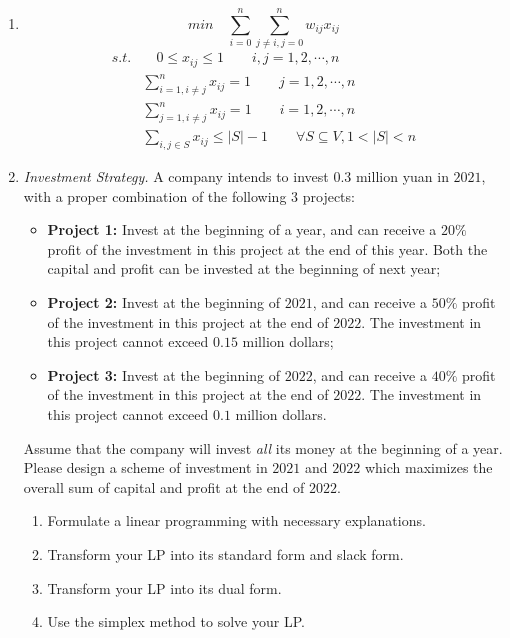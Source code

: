 \documentclass[12pt,a4paper]{article}
\makeatletter
\newtheorem*{solution}{Solution}
\theoremstyle{definition}
\renewenvironment{solution}[1][Solution] {\par\pushQED{\qed}\normalfont\topsep6\p@\@plus6\p@\relax\trivlist\item[\hskip\labelsep\bfseries#1\@addpunct{.}]\ignorespaces}{\popQED\endtrivlist\@endpefalse} \makeatother
\makeatother
\begin{document}
\begin{enumerate}
\begin{solution}
	
	$$min  \quad \sum^{n}_{i = 0}\sum^{n}_{j \neq i, j = 0} w_{ij}x_{ij}$$
	\begin{align*}
	s.t. &\quad 0 \leqslant x_{ij} \leqslant 1 \qquad i,j = 1,2,\cdots,n\\
	&\sum^{n}_{i=1,i \neq j} x_{ij} = 1  \qquad j = 1,2,\cdots,n\\
	&\sum^{n}_{j=1,i \neq j} x_{ij} = 1  \qquad i = 1,2,\cdots,n\\
	&\sum_{i,j \in S} x_{ij} \leqslant |S| - 1 \qquad \forall S \subseteq V, 1 < |S| < n
	\end{align*}
    \end{solution}
    \item
    \textit{Investment Strategy.} A company intends to invest $0.3$ million yuan in $2021$, with a proper combination of the following $3$ projects:
    \begin{itemize}
    \item \textbf{Project 1:} Invest at the beginning of a year, and can receive a $20\%$ profit of the investment in this project at the end of this year. Both the capital and profit can be invested at the beginning of next year;
    \item \textbf{Project 2:} Invest at the beginning of $2021$, and can receive a $50\%$ profit of the investment in this project at the end of $2022$. The investment in this project cannot exceed $0.15$ million dollars;
    \item \textbf{Project 3:} Invest at the beginning of $2022$, and can receive a $40\%$ profit of the investment in this project at the end of $2022$. The investment in this project cannot exceed $0.1$ million dollars.
    \end{itemize}
    Assume that the company will invest \emph{all} its money at the beginning of a year. Please design a scheme of investment in $2021$ and $2022$ which maximizes the overall sum of capital and profit at the end of $2022$.
    \begin{enumerate}
    \item
    Formulate a linear programming with necessary explanations.

    \item
    Transform your LP into its standard form and slack form.

    \item
    Transform your LP into its dual form.

    \item
    Use the simplex method to solve your LP.
    \end{enumerate}
    

\end{enumerate}
\end{document}
